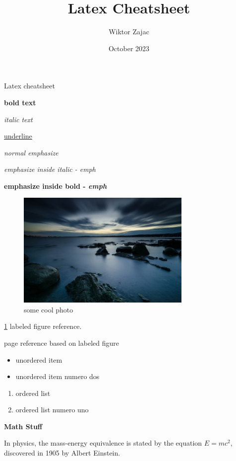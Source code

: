 \documentclass[12pt, a4paper]{article} %
\title{Latex Cheatsheet}
\author{Wiktor Zajac}
\date{October 2023}
\begin{document}
 

\maketitle Latex cheatsheet 
\vspace{5mm}

\textbf{bold text} 

\textit{italic text} 

\underline{underline} 

\emph{normal emphasize}

\textit{emphasize inside italic - \emph{emph}} 

\textbf{emphasize inside bold - \emph{emph}} 


\begin{figure}[h]
	\centering
	\includegraphics[width=0.75\textwidth]{image}
	\caption{some cool photo}
	\label{fig:image}
\end{figure}


\ref{fig:image} labeled figure reference.

\pageref{fig:image} page reference based on labeled figure


\begin{itemize}
	\item unordered item
	\item unordered item numero dos
\end{itemize}

\begin{enumerate}
	\item ordered list
	\item ordered list numero uno
\end{enumerate}

\textbf{Math Stuff}

In physics, the mass-energy equivalence is stated by the equation $E=mc^2$, discovered in 1905 by Albert Einstein.
\end{document}
